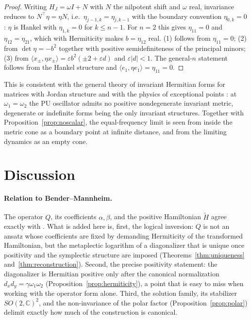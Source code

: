 \documentclass[11pt]{article}
\theoremstyle{definition}
\theoremstyle{remark}
\newcommand{\C}{\mathbb{C}}
\newcommand{\w}{\omega}
\begin{document}
\begin{proof}
Writing $H_J=\w I+N$ with $N$ the nilpotent shift and $\w$ real, invariance
reduces to $N^{\top}\eta=\eta N$, i.e.\
$\eta_{j-1,k}=\eta_{j,k-1}$ with the boundary convention $\eta_{0,k}=0$:
$\eta$ is Hankel with $\eta_{1,k}=0$ for $k\le n-1$.  For $n=2$ this gives
$\eta_{11}=0$ and $\eta_{12}=\eta_{21}$, which with Hermiticity makes
$b=\eta_{12}$ real.  (1) follows from $\eta_{11}=0$; (2) from
$\det\eta=-b^2$ together with positive semidefiniteness of the principal
minors; (3) from
$\langle x_\pm,\eta x_\pm\rangle=\varepsilon b^2(\pm2+\varepsilon d)$ and
$\varepsilon|d|<1$.  The general-$n$ statement follows from the Hankel
structure and $\langle e_1,\eta e_1\rangle=\eta_{11}=0$.
\end{proof}

This is consistent with the general theory of invariant Hermitian forms for
matrices with Jordan structure \cite{GLR2005} and with the physics of
exceptional points \cite{Kato,Heiss2012}: at $\w_1=\w_2$ the PU oscillator
admits no positive nondegenerate invariant metric, degenerate or indefinite
forms being the only invariant structures.  Together with
Proposition~\ref{prop:noscalar}, the equal-frequency limit is seen from
inside the metric cone as a boundary point at infinite distance, and from the
limiting dynamics as an empty cone.

\section{Discussion}\label{sec:discussion}

\paragraph{Relation to Bender--Mannheim.}
The operator $Q$, its coefficients $\alpha,\beta$, and the positive
Hamiltonian $\widetilde H$ agree exactly with
\cite{BM2008PRL,BM2008PRD}.  What is added here is, first, the logical
inversion: $Q$ is not an ansatz whose coefficients are fixed by demanding
Hermiticity of the transformed Hamiltonian, but the metaplectic logarithm of
a diagonalizer that is unique once positivity and the symplectic structure
are imposed (Theorems~\ref{thm:uniqueness} and~\ref{thm:reconstruction}).
Second, the precise positivity statement: the diagonalizer is Hermitian
positive only after the canonical normalization $d_xd_y=\gamma\w_1\w_2$
(Proposition~\ref{prop:hermiticity}), a point that is easy to miss when
working with the operator form alone.  Third, the solution family, its
stabilizer $SO(2,\C)^2$, and the non-invariance of the polar factor
(Proposition~\ref{prop:polar}) delimit exactly how much of the construction
is canonical.
\end{document}
